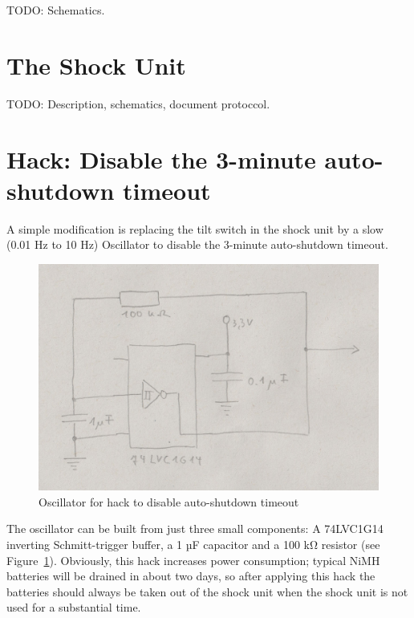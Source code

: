 \documentclass[a4paper]{article}
\begin{document}
TODO: Schematics.

\section{The Shock Unit}

TODO: Description, schematics, document protoccol.

\section{Hack: Disable the 3-minute auto-shutdown timeout}

A simple modification is replacing the tilt switch in the shock unit by a slow (0.01 Hz to 10 Hz) Oscillator to disable the 3-minute auto-shutdown timeout.

\begin{figure}
	\centerline{\includegraphics[scale=1.0]{auto-shutdown-timeout-hack.jpeg}}
	\caption{\label{auto-shutdown-timeout-hack}Oscillator for hack to disable auto-shutdown timeout}
\end{figure}

The oscillator can be built from just three small components: A 74LVC1G14 inverting Schmitt-trigger buffer, a 1 µF capacitor and a 100 k\si{\ohm} resistor (see Figure~\ref{auto-shutdown-timeout-hack}). Obviously, this hack increases power consumption; typical NiMH batteries will be drained in about two days, so after applying this hack the batteries should always be taken out of the shock unit when the shock unit is not used for a substantial time.
\end{document}

